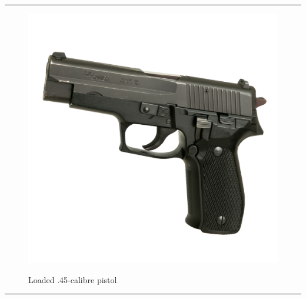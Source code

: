 \documentclass{article}
\begin{document}
    
        \par\noindent\rule{\textwidth}{0.4pt}
    \begin{figure}[H]
        \centering
        \begin{minipage}{0.25\textwidth}
            \centering
            \includegraphics[width=\textwidth]{../SurvivalItemImages/pistol}
        \end{minipage}\hfill
        \begin{minipage}{0.7\textwidth}
            \centering
            \Large Loaded .45-calibre pistol
        \end{minipage}
    \end{figure}
    \vspace{-0.8em}
    \noindent\rule{\textwidth}{0.4pt}
            
\end{document}
